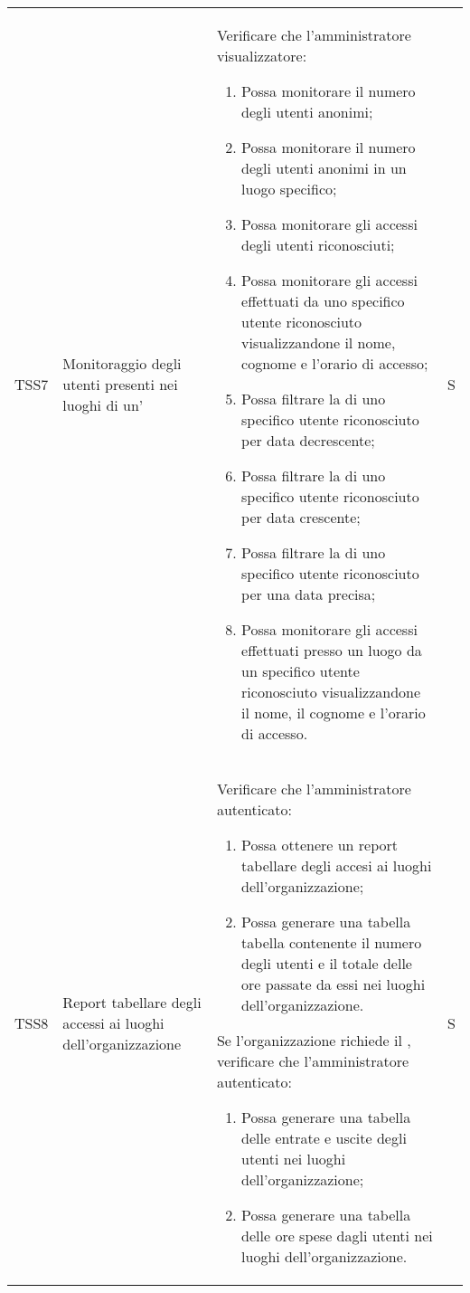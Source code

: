 {\begin{longtable}{ c  C{2.5cm}  C{10cm} C{1cm}}
TSS7 & Monitoraggio degli utenti presenti nei luoghi di un' &
Verificare che l'amministratore visualizzatore:
\begin{enumerate}[resume]
    \item Possa monitorare il numero degli utenti anonimi;
    \item Possa monitorare il numero degli utenti anonimi in un luogo specifico;
    \item Possa monitorare gli accessi degli utenti riconosciuti;
    \item Possa monitorare gli accessi effettuati da uno specifico utente riconosciuto visualizzandone il nome, cognome e l'orario di accesso;
    \item Possa filtrare la  di uno specifico utente riconosciuto per data decrescente;
    \item Possa filtrare la  di uno specifico utente riconosciuto per data crescente;
    \item Possa filtrare la  di uno specifico utente riconosciuto per una data precisa;
    \item Possa monitorare gli accessi effettuati presso un luogo da un specifico utente riconosciuto visualizzandone il nome, il cognome e l’orario di accesso.
\end{enumerate} & S \\

TSS8 & Report tabellare degli accessi ai luoghi dell'organizzazione &
Verificare che l'amministratore autenticato:
\begin{enumerate}
    \item Possa ottenere un report tabellare degli accesi ai luoghi dell'organizzazione;
    \item Possa generare una tabella tabella contenente il numero degli utenti e il totale delle ore passate da essi nei luoghi dell’organizzazione.
\end{enumerate}
Se l'organizzazione richiede il , verificare che l'amministratore autenticato:
\begin{enumerate}[resume]
    \item Possa generare una tabella delle entrate e uscite degli utenti nei luoghi dell'organizzazione;
    \item Possa generare una tabella delle ore spese dagli utenti nei luoghi dell'organizzazione.
\end{enumerate} & S \\


\end{longtable}}
